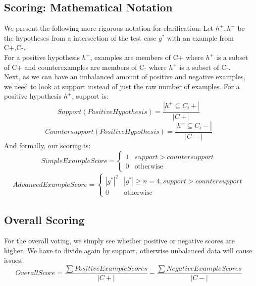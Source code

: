 \documentclass[12pt, a4, epsf] {article}
\theoremstyle{plain}
\theoremstyle{definition}
\begin{document}
\subsection*{Scoring: Mathematical Notation}
We present the following more rigorous notation for clarification:
Let $h^+,h^-$ be the hypotheses from a intersection of the test case $g^*$ with an example from C+,C-.\\
For a positive hypothesis $h^+$, examples are members of C+ where $h^+$ is a subset of C+ and counterexamples are members of C- where $h^+$ is a subset of C-.\\ 
Next, as we can have an imbalanced amount of positive and negative examples, we need to look at support instead of just the raw number of examples. For a positive hypothesis $h^+$, support is:\\
\begin{equation} 
Support(Positive Hypothesis) = \frac{|h^+ \subseteq C_i+|}{|C+|}
\end{equation}
\begin{equation}
Countersupport(Positive Hypothesis) = \frac{|h^+ \subseteq C_i-|}{|C-|}
\end{equation}
And formally, our scoring is:\\
\begin{equation}
Simple Example Score = 
    \begin{cases}
      1 & support > countersupport\\
      0 & \text{otherwise}
    \end{cases}   
\end{equation}
\begin{align*}
Advanced Example Score = 
    \begin{cases}
      |g^*|^2 & |g^*| \geq n=4, support > countersupport\\
      0 & \text{otherwise}
    \end{cases}    
\end{align*}
\subsection*{Overall Scoring}
For the overall voting, we simply see whether positive or negative scores are higher. We have to divide again by support, otherwise unbalanced data will cause issues.\\
\begin{equation}
Overall Score = \frac{\sum{Positive Example Scores}}{|C+|} - \frac{\sum{Negative Example Scores}}{|C-|}
\end{equation}
\end{document}
